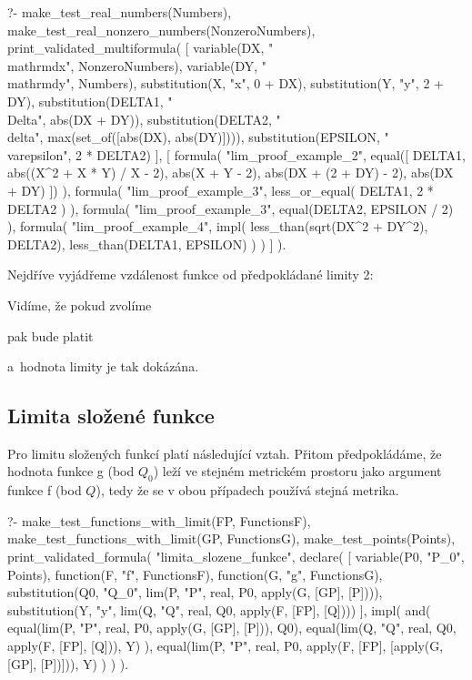 \begin{prolog}
?-	make_test_real_numbers(Numbers),
	make_test_real_nonzero_numbers(NonzeroNumbers),
	print_validated_multiformula(
		[
			variable(DX, "\\mathrm{d}x", NonzeroNumbers),
			variable(DY, "\\mathrm{d}y", Numbers),
			substitution(X, "x", 0 + DX),
			substitution(Y, "y", 2 + DY),
			substitution(DELTA1, "\\Delta", abs(DX + DY)),
			substitution(DELTA2, "\\delta", max(set_of([abs(DX), abs(DY)]))),
			substitution(EPSILON, "\\varepsilon", 2 * DELTA2)
		],
		[
			formula(
				"lim_proof_example_2",
				equal([
					DELTA1,
					abs((X^2 + X * Y) / X - 2),
					abs(X + Y - 2),
					abs(DX + (2 + DY) - 2),
					abs(DX + DY)
				])
			),
			formula(
				"lim_proof_example_3",
				less_or_equal(
					DELTA1,
					2 * DELTA2
				)
			),
			formula(
				"lim_proof_example_3",
				equal(DELTA2, EPSILON / 2)
			),
			formula(
				"lim_proof_example_4",
				impl(
					less_than(sqrt(DX^2 + DY^2), DELTA2),
					less_than(DELTA1, EPSILON)
				)
			)
		]
	).
\end{prolog}

Nejdříve vyjádřeme vzdálenost funkce od předpokládané limity 2:

Vidíme, že pokud zvolíme

pak bude platit

a~hodnota limity je tak dokázána.

\subsection{Limita složené funkce}

Pro limitu složených funkcí platí následující vztah. Přitom předpokládáme, že hodnota funkce g (bod \(Q_0\)) leží ve stejném metrickém prostoru jako argument funkce f (bod \(Q\)), tedy že se v obou případech používá stejná metrika.

\begin{prolog}
?-	make_test_functions_with_limit(FP, FunctionsF),
	make_test_functions_with_limit(GP, FunctionsG),
	make_test_points(Points),
	print_validated_formula(
		"limita_slozene_funkce",
		declare(
			[
				variable(P0, "P_0", Points),
				function(F, "f", FunctionsF),
				function(G, "g", FunctionsG),
				substitution(Q0, "Q_0", lim(P, "P", real, P0, apply(G, [GP], [P]))),
				substitution(Y, "y", lim(Q, "Q", real, Q0, apply(F, [FP], [Q])))
			],
			impl(
				and(
					equal(lim(P, "P", real, P0, apply(G, [GP], [P])), Q0),
					equal(lim(Q, "Q", real, Q0, apply(F, [FP], [Q])), Y)
				),
				equal(lim(P, "P", real, P0, apply(F, [FP], [apply(G, [GP], [P])])), Y)
			)
		)
	).
\end{prolog}

